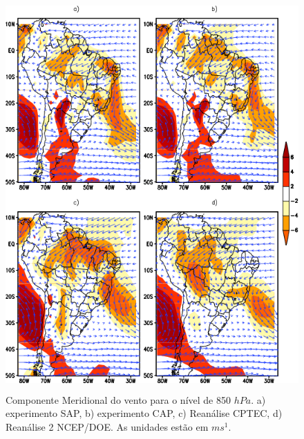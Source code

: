 \begin{figure}[!hbp]
\centering
\includegraphics[height=15cm]{./figs/media_vento-meridional_anl_850hPa.png}
\caption{Componente Meridional do vento para o nível de 850 $hPa$. a) experimento SAP, b) experimento CAP, c) Reanálise CPTEC, d) Reanálise 2 NCEP/DOE. As unidades estão em $ms^{1}$.}
\label{fig15}
\end{figure}

